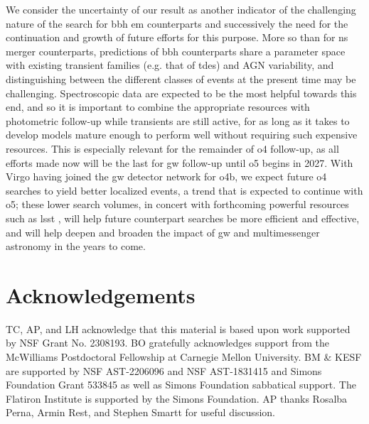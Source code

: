 \documentclass[twocolumn]{aastex631}
\begin{document}
We consider the uncertainty of our result as another indicator of the challenging nature of the search for \gls{bbh} \gls{em} counterparts and successively the need for the continuation and growth of future efforts for this purpose.
More so than for \gls{ns} merger counterparts, predictions of \gls{bbh} counterparts share a parameter space with existing transient families (e.g. that of \glspl{tde}) and AGN variability, and distinguishing between the different classes of events at the present time may be challenging.
Spectroscopic data are expected to be the most helpful towards this end, and so it is important to combine the appropriate resources with photometric follow-up while transients are still active, for as long as it takes to develop models mature enough to perform well without requiring such expensive resources.
This is especially relevant for the remainder of \gls{o4} follow-up, as all efforts made now will be the last  for \gls{gw} follow-up until \gls{o5} begins in 2027.
With Virgo having joined the \gls{gw} detector network for \gls{o4}b, we expect future \gls{o4} searches to yield better localized events, a trend that is expected to continue with \gls{o5}; these lower search volumes, in concert with forthcoming powerful resources such as \gls{lsst} \citep{ivezicLSSTScienceDrivers2019}, will help future counterpart searches be more efficient and effective, and will help deepen and broaden the impact of \gls{gw} and multimessenger astronomy in the years to come.

\section*{Acknowledgements}

TC, AP, and LH acknowledge that this material is based upon work supported by NSF Grant No. 2308193. BO gratefully acknowledges support from the McWilliams Postdoctoral Fellowship at Carnegie Mellon University. BM \& KESF are supported by NSF AST-2206096 and NSF AST-1831415 and Simons Foundation Grant 533845 as well as Simons Foundation sabbatical support. The Flatiron Institute is supported by the Simons Foundation. AP thanks Rosalba Perna, Armin Rest, and Stephen Smartt for useful discussion.
\end{document}
